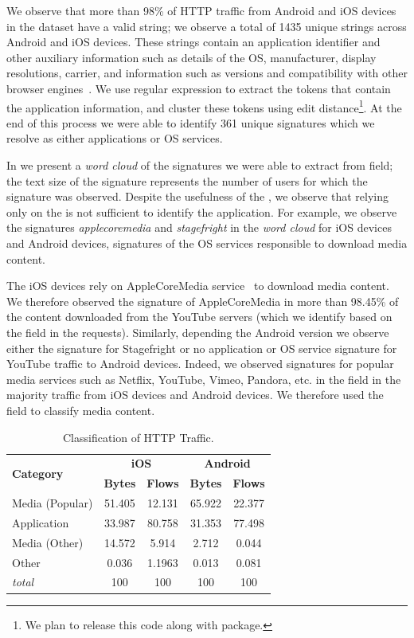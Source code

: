 We observe that more than 98\% of HTTP traffic from Android and iOS devices in the \mobWild dataset have a valid \useragent string; we observe a total of 1435 unique \useragent strings across Android and iOS devices. 
These \useragent strings contain an application identifier and other auxiliary information such as details of the OS, manufacturer, display resolutions, carrier, and information such as versions and compatibility with other browser engines~\cite{mozilla:useragentdetection}. 
We use regular expression to extract the tokens that contain the application information, and cluster these tokens using edit distance\footnote{We plan to release this code along with \platname package.}.
At the end of this process we were able to identify 361 unique signatures which we resolve as either applications or OS services. 

In  we present a \emph{word cloud} of the signatures we were able to extract from \useragent field; the text size of the signature represents the number of users for which the signature was observed.
Despite the usefulness of the \useragent, we observe that relying only on the \useragent is not sufficient to identify the application.
For example, we observe the signatures \emph{applecoremedia} and \emph{stagefright} in the \emph{word cloud} for iOS devices and Android devices, signatures of the OS services responsible to download media content.

The iOS devices rely on AppleCoreMedia service~\cite{apple:coremedia} to download media content.
We therefore observed the signature of AppleCoreMedia in more than 98.45\% of the content downloaded from the YouTube servers (which we identify based on the \httphost field in the \httpget requests). 
Similarly, depending the Android version we observe either the signature for Stagefright\cite{android:stagefright} or no application or OS service signature for YouTube traffic to Android devices. 
Indeed, we observed signatures for popular media services such as Netflix, YouTube, Vimeo, Pandora, etc. in the \httphost field in the majority traffic from iOS devices and Android devices. 
We therefore used the \httphost field to classify media content.

\begin{table}
\centering
\begin{small}
\begin{tabular}{|p{}|c|c|c|c|}
\hline
\multirow{2}{*}{\bf Category} & \multicolumn{2}{c|}{\bf iOS} &  \multicolumn{2}{c|}{\bf Android} \tabularnewline
\cline{2-5}
  & {\bf Bytes}  & {\bf Flows} & {\bf Bytes} & {\bf Flows}   \tabularnewline
\hline
Media (Popular)         & 51.405  & 12.131 & 65.922 & 22.377 \tabularnewline
\hline
Application             & 33.987  & 80.758 & 31.353 & 77.498 \tabularnewline
\hline
Media (Other)       & 14.572  &  5.914 &  2.712 &  0.044 \tabularnewline
\hline
Other                   &  0.036  & 1.1963 &  0.013 &  0.081 \tabularnewline
\hline
{\em total}            & 100 & 100 & 100 & 100 \tabularnewline
\hline
\end{tabular}
\end{small}
\caption{Classification of HTTP Traffic.}
\label{tab:classify-http}
\end{table}

